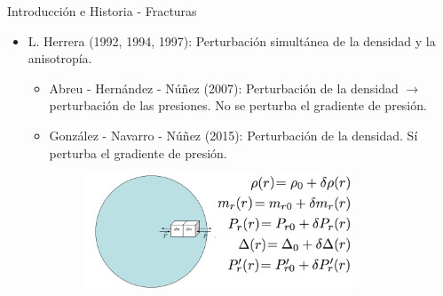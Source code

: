 \documentclass[handout,t]{beamer}
\begin{document}
\begin{frame}{Introducción e Historia - Fracturas}

\begin{itemize}

\vspace{-3mm}

\item L. Herrera (1992, 1994, 1997): Perturbación simultánea de la densidad y la anisotropía.

\vspace{1mm}

\begin{itemize}
\item Abreu - Hernández - Núñez (2007): Perturbación de la densidad $\rightarrow$ perturbación de las presiones. No se perturba el gradiente de presión.

\vspace{2mm}

\item González - Navarro - Núñez (2015): Perturbación de la densidad. Sí perturba el gradiente de presión.

\vspace{2mm}



\begin{figure}[h]
\includegraphics[width=0.8\textwidth]{Frac.png}
\end{figure}

\end{itemize}


\vspace{2mm}

 


\end{itemize}


\end{frame}
\end{document}
